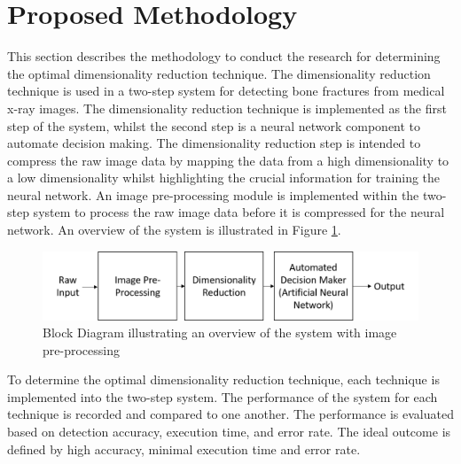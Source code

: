 \documentclass[11pt,twocolumn]{witseiepaper}
\begin{document}
	\section{Proposed Methodology}
	\label{sc: Proposed Methodology}
	This section describes the methodology to conduct the research for determining the optimal dimensionality reduction technique. The dimensionality reduction technique is used in a two-step system for detecting bone fractures from medical x-ray images.
	The dimensionality reduction technique is implemented as the first step of the system, whilst the second step is a neural network component to automate decision making. The dimensionality reduction step is intended to compress the raw image data by mapping the data from a high dimensionality to a low dimensionality whilst highlighting the crucial information for training the neural network. An image pre-processing module is implemented within the two-step system to process the raw image data before it is compressed for the neural network. An overview of the system is illustrated in Figure \ref{fig:system overview}.
	\vspace{-3mm}
	\begin{figure}[!h]
		\centering
		\includegraphics[scale=0.23]{system_overview_2.png}
		\caption{Block Diagram illustrating an overview of the system with image pre-processing }
		\label{fig:system overview}
	\end{figure}
	
	To determine the optimal dimensionality reduction technique, each technique is implemented into the two-step system. The performance of the system for each technique is recorded and compared to one another. The performance is evaluated based on detection accuracy, execution time, and error rate. The ideal outcome is defined by high accuracy, minimal execution time and error rate.
	
\end{document}
